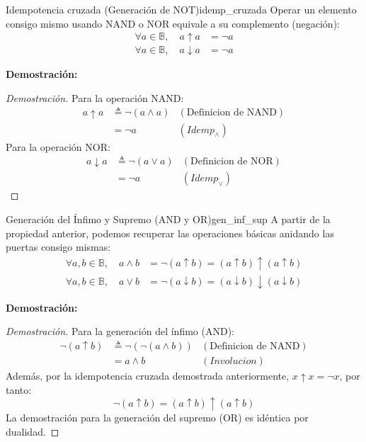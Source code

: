 \documentclass[12pt,a4paper]{article}
\newcommand{\desplegable}[2]{%
  \par\vspace{1ex}\noindent
  \textbf{Demostración:}
  \vspace{1ex}
  
  #2
  \par\vspace{1ex}
}
\begin{document}
\begin{teorema}{Idempotencia cruzada (Generación de NOT)}{idemp_cruzada}
Operar un elemento consigo mismo usando NAND o NOR equivale a su complemento (negación):
\begin{align*}
    \forall a \in \mathbb{B}, \quad a \uparrow a &= \neg a \\
    \forall a \in \mathbb{B}, \quad a \downarrow a &= \neg a
\end{align*}
\end{teorema}
\desplegable{proof_idemp_cruzada}{
\begin{proof}[Demostración]
Para la operación NAND:
\begin{align*}
    a \uparrow a &\triangleq \neg (a \wedge a) & (\text{Definicion de NAND}) \\
                 &= \neg a & (Idemp_\wedge)
\end{align*}
Para la operación NOR:
\begin{align*}
    a \downarrow a &\triangleq \neg (a \vee a) & (\text{Definicion de NOR}) \\
                   &= \neg a & (Idemp_\vee)
\end{align*}
\end{proof}
}

\begin{teorema}{Generación del Ínfimo y Supremo (AND y OR)}{gen_inf_sup}
A partir de la propiedad anterior, podemos recuperar las operaciones básicas anidando las puertas consigo mismas:
\begin{align*}
    \forall a, b \in \mathbb{B}, \quad a \wedge b &= \neg (a \uparrow b) = (a \uparrow b) \uparrow (a \uparrow b) \\
    \forall a, b \in \mathbb{B}, \quad a \vee b &= \neg (a \downarrow b) = (a \downarrow b) \downarrow (a \downarrow b)
\end{align*}
\end{teorema}
\desplegable{proof_gen_inf_sup}{
\begin{proof}[Demostración]
Para la generación del ínfimo (AND):
\begin{align*}
    \neg(a \uparrow b) &\triangleq \neg(\neg(a \wedge b)) & (\text{Definicion de NAND}) \\
                       &= a \wedge b & (Involucion)
\end{align*}
Además, por la idempotencia cruzada demostrada anteriormente, $x \uparrow x = \neg x$, por tanto:
\[ \neg(a \uparrow b) = (a \uparrow b) \uparrow (a \uparrow b) \]
La demostración para la generación del supremo (OR) es idéntica por dualidad.
\end{proof}
}
\end{document}
